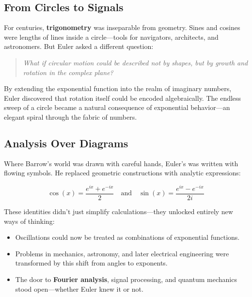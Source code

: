 \subsection{From Circles to Signals}

For centuries, \textbf{trigonometry} was inseparable from geometry. Sines and cosines were lengths of lines inside a circle—tools for navigators, architects, and astronomers. But Euler asked a different question:

\begin{quote}
\textit{What if circular motion could be described not by shapes, but by growth and rotation in the complex plane?}
\end{quote}

By extending the exponential function into the realm of imaginary numbers, Euler discovered that rotation itself could be encoded algebraically. The endless sweep of a circle became a natural consequence of exponential behavior—an elegant spiral through the fabric of numbers.

\subsection{Analysis Over Diagrams}

Where Barrow’s world was drawn with careful hands, Euler’s was written with flowing symbols. He replaced geometric constructions with analytic expressions:

\[
\cos(x) = \frac{e^{ix} + e^{-ix}}{2}
\quad \text{and} \quad
\sin(x) = \frac{e^{ix} - e^{-ix}}{2i}
\]

These identities didn’t just simplify calculations—they unlocked entirely new ways of thinking:

\begin{itemize}
    \item Oscillations could now be treated as combinations of exponential functions.
    \item Problems in mechanics, astronomy, and later electrical engineering were transformed by this shift from angles to exponents.
    \item The door to \textbf{Fourier analysis}, signal processing, and quantum mechanics stood open—whether Euler knew it or not.
\end{itemize}

